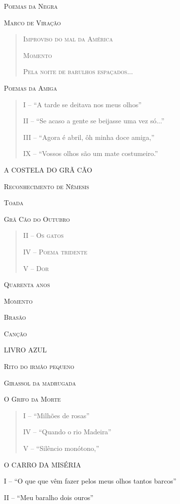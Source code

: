 
\textsc{Poemas da Negra}

\textsc{Marco de Viração}

\begin{quote}
\textsc{Improviso do mal da América}

\textsc{Momento}

\textsc{Pela noite de barulhos espaçados...}
\end{quote}

\textsc{Poemas da Amiga}

\begin{quote}
I -- ``A tarde se deitava nos meus olhos''

II -- ``Se acaso a gente se beijasse uma vez só...''

III -- ``Agora é abril, ôh minha doce amiga,''

IX -- ``Vossos olhos são um mate costumeiro.''
\end{quote}

A COSTELA DO GRÃ CÃO

\textsc{Reconhecimento de Nêmesis}

\textsc{Toada}

\textsc{Grã Cão do Outubro}

\begin{quote}
\textsc{II -- Os gatos }

\textsc{IV -- Poema tridente }

\textsc{V -- Dor }
\end{quote}

\textsc{Quarenta anos}

\textsc{Momento}

\textsc{Brasão}

\textsc{Canção}

LIVRO AZUL

\textsc{Rito do irmão pequeno}

\textsc{Girassol da madrugada}

\textsc{O Grifo da Morte}

\begin{quote}
I -- ``Milhões de rosas''

\textsc{IV -- ``}Quando o rio Madeira''

\textsc{V -- ``}Silêncio monótono,''
\end{quote}

O CARRO DA MISÉRIA

I -- ``O que que vêm fazer pelos meus olhos tantos barcos''

II -- ``Meu baralho dois ouros''

